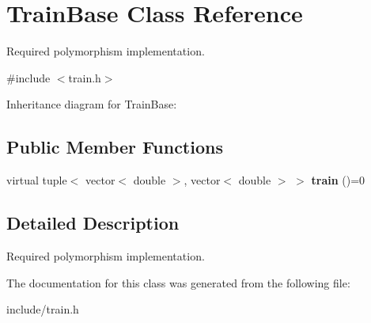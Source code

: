 \hypertarget{classTrainBase}{}\section{Train\+Base Class Reference}
\label{classTrainBase}


Required polymorphism implementation.  




{\ttfamily \#include $<$train.\+h$>$}



Inheritance diagram for Train\+Base\+:
\subsection*{Public Member Functions}
\begin{DoxyCompactItemize}
\item 
\mbox{\label{classTrainBase_acdae4d4582726a5323dd8a89cc115e2b}} 
virtual tuple$<$ vector$<$ double $>$, vector$<$ double $>$ $>$ {\bfseries train} ()=0
\end{DoxyCompactItemize}


\subsection{Detailed Description}
Required polymorphism implementation. 

The documentation for this class was generated from the following file\+:\begin{DoxyCompactItemize}
\item 
include/train.\+h\end{DoxyCompactItemize}
